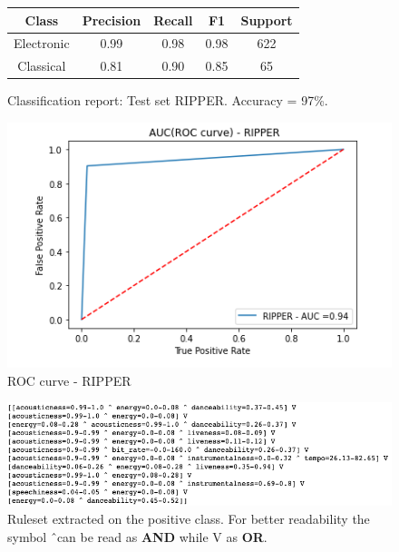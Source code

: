 \begin{figure}[!htb]
   \begin{minipage}{0.46\textwidth}
     \begin{tabular}{ccccc}
     \hline
     \textbf{Class} & \textbf{Precision} & \textbf{Recall} & \textbf{F1} & \textbf{Support} \\ \hline
     Electronic          & 0.99               & 0.98            & 0.98        & 622             \\ \hline
     Classical            & 0.81               & 0.90            & 0.85        & 65            
     \end{tabular}
     \caption{Classification report: Test set RIPPER. Accuracy = 97\%. }
     \label{Classification report: Test set Ripper}
   \end{minipage}\hfill
   \begin{minipage}{0.42\textwidth}
     \centering
     \includegraphics[width=1\linewidth]{images/auc-ripper.png}
     \caption{ROC curve - RIPPER}\label{Fig:Data2}
   \end{minipage}
\end{figure}


\begin{figure}[!htb]
  \centering
  \includegraphics[width=0.75\linewidth]{images/ruleset-out_model.png}
  \caption{Ruleset extracted on the positive class. For better readability the symbol \^\ can be read as \textbf{AND} while V as \textbf{OR}.}
\end{figure}

